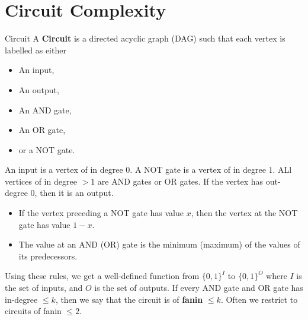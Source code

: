 \documentclass{article}
\begin{document}
\section{Circuit Complexity}
\begin{fancydefine}{Circuit}
    A \textbf{Circuit} is a directed acyclic graph (DAG) such that each vertex is labelled as either \begin{itemize}
        \item An input,
        \item An output,
        \item An AND gate,
        \item An OR gate,
        \item or a NOT gate.
    \end{itemize}
    An input is a vertex of in degree $0$. A NOT gate is a vertex of in degree $1$. ALl vertices of in degree $>1$ are AND gates or OR gates. If the vertex has out-degree $0$, then it is an output.\gap 
    \begin{itemize}
        \item If the vertex preceding a NOT gate has value $x$, then the vertex at the NOT gate has value $1-x$.
        \item The value at an AND (OR) gate is the minimum (maximum) of the values of its predecessors.
    \end{itemize}
    Using these rules, we get a well-defined function from $\{0,1\}^{I}$ to $\{0,1\}^{O}$ where $I$ is the set of inputs, and $O$ is the set of outputs.\gap 
    If every AND gate and OR gate has in-degree $\leq k$, then we say that the circuit is of \textbf{fanin} $\leq k$. Often we restrict to circuits of fanin $\leq 2$.
\end{fancydefine}
\end{document}

